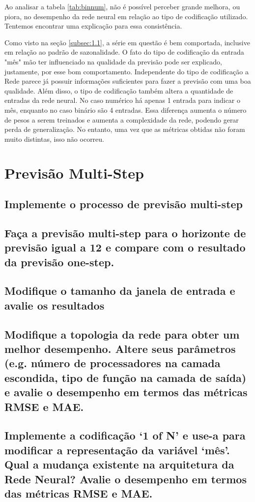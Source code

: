 \documentclass[12pt]{article}
\begin{document}
	Ao analisar a tabela \ref{tab:binnum}, não é possível perceber grande melhora, ou piora, no desempenho da rede neural em relação ao tipo de codificação utilizado. Tentemos encontrar uma explicação para essa consistência. 
	
	Como visto na seção \ref{subsec:1.1}, a série em questão é bem comportada, inclusive em relação ao padrão de sazonalidade. O fato do tipo de codificação da entrada "mês" mão ter influenciado na qualidade da previsão pode ser explicado, justamente, por esse bom comportamento. Independente do tipo de codificação a Rede parece já possuir informações suficientes para fazer a previsão com uma boa qualidade. Além disso, o tipo de codificação também altera a quantidade de entradas da rede neural. No caso numérico há apenas 1 entrada para indicar o mês, enquanto no caso binário são 4 entradas. Essa diferença aumenta o número de pesos a serem treinados e aumenta a complexidade da rede, podendo gerar perda de generalização. No entanto, uma vez que as métricas obtidas não foram muito distintas, isso não ocorreu.
	
	\section{Previsão Multi-Step}
	
	\subsection{Implemente o processo de previsão multi-step}
	
	\subsection{Faça a previsão multi-step para o horizonte de previsão igual a 12 e compare com o resultado da previsão one-step.}
	
	\subsection{Modifique o tamanho da janela de entrada e avalie os resultados}
	
	\subsection{Modifique a topologia da rede para obter um melhor desempenho. Altere seus parâmetros (e.g. número de processadores na camada escondida, tipo de função na camada de saída) e avalie o desempenho em termos das métricas RMSE e MAE.}
	
	\subsection{Implemente a codificação ‘1 of N’ e use-a para modificar a representação da variável ‘mês’. Qual a mudança existente na arquitetura da Rede	Neural? Avalie o desempenho em termos das métricas RMSE e MAE.}
	

	 
	
\end{document}

